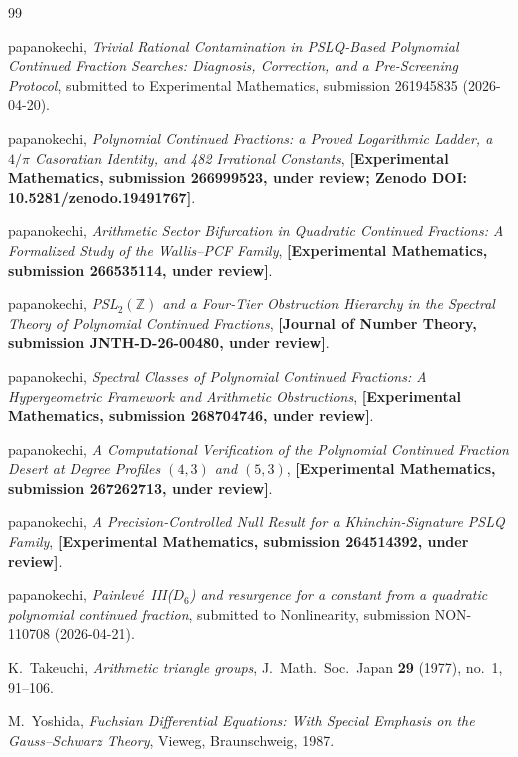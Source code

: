 \documentclass[12pt]{amsart}
\newcommand{\PLACEHOLDER}[1]{{\color{red}\textbf{[#1]}}}
\begin{document}
\begin{thebibliography}{99}

  papanokechi,
  \textit{Trivial Rational Contamination in
  PSLQ-Based Polynomial Continued Fraction
  Searches: Diagnosis, Correction, and a
  Pre-Screening Protocol},
  submitted to Experimental Mathematics,
  submission 261945835 (2026-04-20).

  papanokechi,
  \textit{Polynomial Continued Fractions:
  a Proved Logarithmic Ladder, a $4/\pi$
  Casoratian Identity, and 482 Irrational
  Constants},
  \PLACEHOLDER{Experimental Mathematics,
  submission 266999523, under review;
  Zenodo DOI: 10.5281/zenodo.19491767}.

  papanokechi,
  \textit{Arithmetic Sector Bifurcation in
  Quadratic Continued Fractions: A Formalized
  Study of the Wallis--PCF Family},
  \PLACEHOLDER{Experimental Mathematics,
  submission 266535114, under review}.

  papanokechi,
  \textit{PSL$_2(\mathbb{Z})$ and a Four-Tier
  Obstruction Hierarchy in the Spectral Theory
  of Polynomial Continued Fractions},
  \PLACEHOLDER{Journal of Number Theory,
  submission JNTH-D-26-00480, under review}.

  papanokechi,
  \textit{Spectral Classes of Polynomial
  Continued Fractions: A Hypergeometric
  Framework and Arithmetic Obstructions},
  \PLACEHOLDER{Experimental Mathematics,
  submission 268704746, under review}.

  papanokechi,
  \textit{A Computational Verification of the
  Polynomial Continued Fraction Desert at
  Degree Profiles $(4,3)$ and $(5,3)$},
  \PLACEHOLDER{Experimental Mathematics,
  submission 267262713, under review}.

  papanokechi,
  \textit{A Precision-Controlled Null Result
  for a Khinchin-Signature PSLQ Family},
  \PLACEHOLDER{Experimental Mathematics,
  submission 264514392, under review}.

  papanokechi,
  \textit{Painlev\'e~III($D_6$) and resurgence
  for a constant from a quadratic polynomial
  continued fraction},
  submitted to Nonlinearity,
  submission NON-110708 (2026-04-21).

  K.~Takeuchi,
  \textit{Arithmetic triangle groups},
  J.\ Math.\ Soc.\ Japan \textbf{29} (1977),
  no.~1, 91--106.

  M.~Yoshida,
  \textit{Fuchsian Differential Equations:
  With Special Emphasis on the Gauss--Schwarz
  Theory},
  Vieweg, Braunschweig, 1987.


\end{thebibliography}
\end{document}
